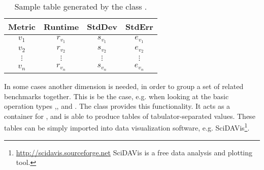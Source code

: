 \begin{table}
	\begin{center}
		\begin{tabular}{c|ccc}
			Metric & Runtime & StdDev & StdErr\\
			\hline
			$v_1$ & $r_{v_1}$ & $s_{v_1}$ & $e_{v_1}$ \\
			$v_2$ & $r_{v_2}$ & $s_{v_2}$ & $e_{v_2}$ \\
			$\vdots$& $\vdots$ & $\vdots$ & $\vdots$\\
			$v_n$ &$r_{v_n}$ &$s_{v_n}$ &$e_{v_n}$ 
		\end{tabular}
		\caption{Sample table generated by the class .}
		\label{tab:suite_tablegen_table}
	\end{center}
\end{table}

In some cases another dimension is needed, in order to group a set of related benchmarks together. This is be the case, e.g. when looking at the basic operation types \code{+},\code{-},\code{*} and \code{/}. The class  provides this functionality. It acts as a container for , and is able to produce tables of tabulator-separated values. These tables can be simply imported into data visualization software, e.g. SciDAVis\footnote{\url{http://scidavis.sourceforge.net} SciDAVis is a free data analysis and plotting tool.}. \\

